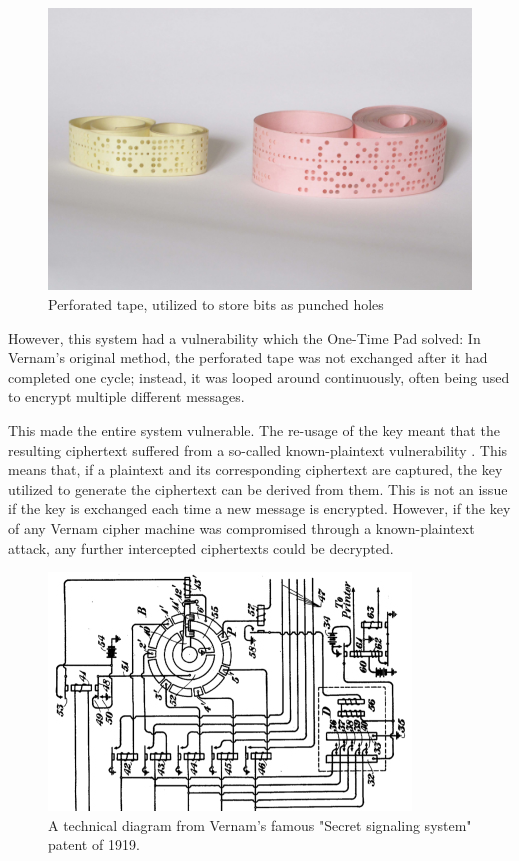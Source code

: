 \documentclass[12pt]{report}
\theoremstyle{definition}
\theoremstyle{remark}
\begin{document}
\begin{figure}[H]
\centering
\includegraphics[scale=0.5]{PerforatedTape}
\caption{Perforated tape, utilized to store bits as punched holes}
\end{figure}

However, this system had a vulnerability which the One-Time Pad solved: In Vernam's original method, the perforated tape was not exchanged after it had completed one cycle; instead, it was looped around continuously, often being used to encrypt multiple different messages.

This made the entire system vulnerable. The re-usage of the key meant that the resulting ciphertext suffered from a so-called known-plaintext vulnerability \cite{HutSix}. This means that, if a plaintext and its corresponding ciphertext are captured, the key utilized to generate the ciphertext can be derived from them. This is not an issue if the key is exchanged each time a new message is encrypted. However, if the key of any Vernam cipher machine was compromised through a known-plaintext attack, any further intercepted ciphertexts could be decrypted.

\begin{figure}[H]
\centering
\includegraphics[scale=1]{VernamCipher.jpg}
\caption{A technical diagram from Vernam's famous "Secret signaling system" patent of 1919.}
\end{figure}    
\end{document}
